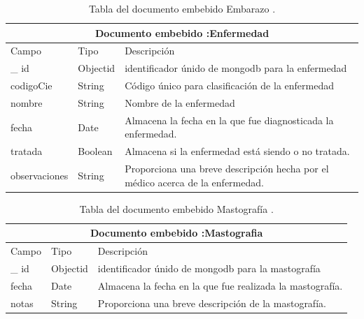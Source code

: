 	
	\begin{table}[htb]
	\centering
	\begin{tabular}{| p{3.5cm}| p{3.0cm} | p{9.8cm} |}
	\hline
	\multicolumn{3}{|c|}{Documento embebido :Enfermedad} \\
	\hline
	Campo & Tipo &  Descripción\\ \hline
	
	\_ id & Objectid &identificador únido de mongodb para la enfermedad \\ \hline
	
	codigoCie & String & Código único para clasificación de la enfermedad \\ \hline
	
	nombre & String & Nombre de la enfermedad \\ \hline	
	
	fecha & Date & Almacena la fecha en la que fue diagnosticada la enfermedad.
	\\ \hline
	
	tratada & Boolean & Almacena si la enfermedad está siendo o no tratada. \\ \hline	
	
	observaciones & String & Proporciona una breve descripción hecha por el médico acerca de la enfermedad. \\ \hline 

	\end{tabular}
	\caption{Tabla del documento embebido Embarazo .}
	\label{tabla:diccionarioDatos}
	\end{table}
	
	
	
	
	\begin{table}[htb]
	\centering
	\begin{tabular}{| p{3.5cm}| p{3.0cm} | p{9.8cm} |}
	\hline
	\multicolumn{3}{|c|}{Documento embebido :Mastografia} \\
	\hline
	Campo & Tipo &  Descripción\\ \hline
	
	\_ id & Objectid &identificador únido de mongodb para la mastografía  \\ \hline
	
	fecha & Date & Almacena la fecha en la que fue realizada la mastografía.
	\\ \hline
	notas & String & Proporciona una breve descripción de la mastografía.  \\ \hline

	\end{tabular}
	\caption{Tabla del documento embebido Mastografía .}
	\label{tabla:diccionarioDatos}
	\end{table}
	
